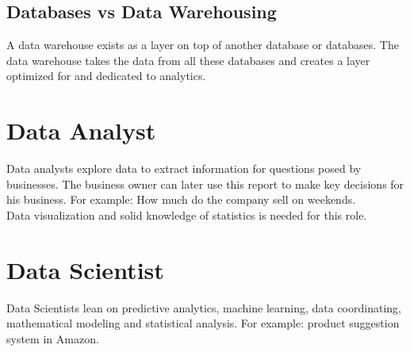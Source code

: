 \documentclass[twocolumn,a4paper, 10pt]{article}
\begin{document}
		\subsection{Databases vs Data Warehousing}
			A data warehouse exists as a layer on top of another database or databases.
			The data warehouse takes the data from all these databases and creates a
			layer optimized for and dedicated to analytics.
	\section{Data Analyst}
		Data analysts explore data to extract information for questions posed by businesses. The business owner
		can later use this report to make key decisions for his business. 
		For example: How much do the company sell on weekends. \\
		Data visualization and solid knowledge of statistics is needed for this role.
	\section{Data Scientist}	
		Data Scientists lean on predictive analytics, machine learning, data coordinating, mathematical modeling 
		and statistical analysis.
		For example: product suggestion system in Amazon.
\end{document}

